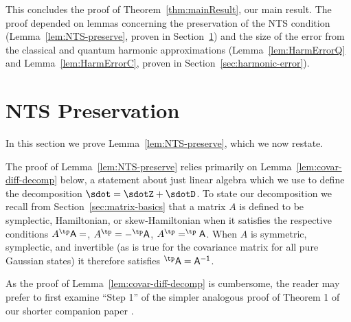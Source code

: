 \documentclass{article}
\numberwithin{equation}{section}
\begin{document}
This concludes the proof of Theorem~\ref{thm:mainResult}, our main result.  The proof depended on lemmas concerning the preservation of the NTS condition (Lemma~\ref{lem:NTS-preserve}, proven in Section~\ref{sec:linear-algebra-facts}) and the size of the error from the classical and quantum harmonic approximations (Lemma~\ref{lem:HarmErrorQ} and Lemma~\ref{lem:HarmErrorC}, proven in Section~\ref{sec:harmonic-error}). 



\section{NTS Preservation}
\label{sec:linear-algebra-facts}

In this section we prove Lemma~\ref{lem:NTS-preserve}, which 
we now restate.
\lemNTSpreservation*

The proof of Lemma~\ref{lem:NTS-preserve} relies primarily on Lemma~\ref{lem:covar-diff-decomp} below, a 
statement about just linear algebra which we use to define the decomposition
$\sdot = \sdotZ+\sdotD$.  To state our decomposition we recall from Section~\ref{sec:matrix-basics} that a matrix $A$ is defined to be symplectic, Hamiltonian, or skew-Hamiltonian when it satisfies the respective conditions $A^\tp \sf A=\sf$, $A^\tp = -\sf^\tp A \sf$, $A^\tp = \sf^\tp A \sf$.  When $A$ is symmetric, symplectic, and invertible (as is true for the covariance matrix for all pure Gaussian states) it therefore satisfies $\sf^\tp A \sf = A^{-1}$.

As the proof of Lemma~\ref{lem:covar-diff-decomp} is cumbersome, the reader may prefer to first examine ``Step 1'' of the simpler analogous proof of Theorem 1 of our shorter companion paper \cite{hernandez2023decoherence1}. 


		
		
		
\end{document}
